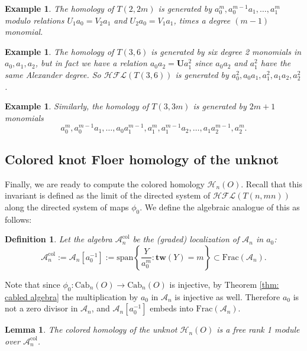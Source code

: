 \documentclass{amsart}
\newtheorem{lemma}[theorem]{Lemma}
\newtheorem{example}[theorem]{Example}
\newtheorem{definition}[theorem]{Definition}
\newcommand{\CA}{\mathcal{A}}
\newcommand{\Cab}{\mathrm{Cab}}
\newcommand{\col}{\mathrm{col}}
\newcommand{\cHFL}{\mathcal{H\!F\! L}}
\newcommand{\HD}{\mathcal{H}}
\newcommand{\tw}{\mathbf{tw}}
\newcommand{\UU}{\mathbf{U}}
\newcommand{\spann}{\mathrm{span}}
\begin{document}


\begin{example}
The homology of $T(2,2m)$ is generated by $a_0^m,a_0^{m-1}a_1,\ldots,a_1^{m}$ modulo relations $U_1a_0=V_2a_1$ and $U_2a_0=V_1a_1$, times a degree $(m-1)$ monomial. 
\end{example}

\begin{example}
The homology of $T(3,6)$ is generated by  six degree 2 monomials  in $a_0,a_1,a_2$, but in fact we have a relation $a_0a_2=\UU a_1^2$ since $a_0a_2$ and $a_1^2$ have the same Alexander degree. So $\cHFL(T(3,6))$ is generated by $a_0^2,a_0a_1,a_1^2,a_1a_2,a_2^2$.
\end{example}

\begin{example}
Similarly, the homology of $T(3,3m)$ is generated by $2m+1$ monomials
$$
a_0^{m},a_0^{m-1}a_1,\ldots,a_0a_1^{m-1},a_1^{m},a_1^{m-1}a_2,\ldots,a_1a_2^{m-1},a_2^{m}.
$$
\end{example}

 

\subsection{Colored knot Floer homology of the unknot} Finally, we are ready to compute the colored homology $\HD_{n}(O)$. Recall that this invariant is defined as the limit of the directed system of $\cHFL(T(n,mn))$ along the directed system of maps
$\phi_{0}$. We define the algebraic analogue of this as follows:

\begin{definition}
Let the algebra $\CA_n^{\col}$
be the (graded) localization of $\CA_n$ in $a_0$:
$$
\CA_n^{\col}:=\CA_n[a_0^{-1}]:=\spann\left\{\frac{Y}{a_0^m}:\tw(Y)=m\right\}\subset \mathrm{Frac}(\CA_n).
$$

\end{definition}

Note that since $\phi_0:\Cab_n(O)\to \Cab_n(O)$ is injective, by Theorem \ref{thm: cabled algebra} the multiplication by $a_0$ in $\CA_n$ is injective as well. Therefore $a_0$ is not a zero divisor in $\CA_n$, and $\CA_n[a_0^{-1}]$ embeds into $\mathrm{Frac}(\CA_n).$

\begin{lemma}
\label{lem: colored unknot as localization}
The colored homology of the unknot $\HD_{n}(O)$ is a free rank 1 module over $\CA_n^{\col}$.
\end{lemma}
\end{document}

